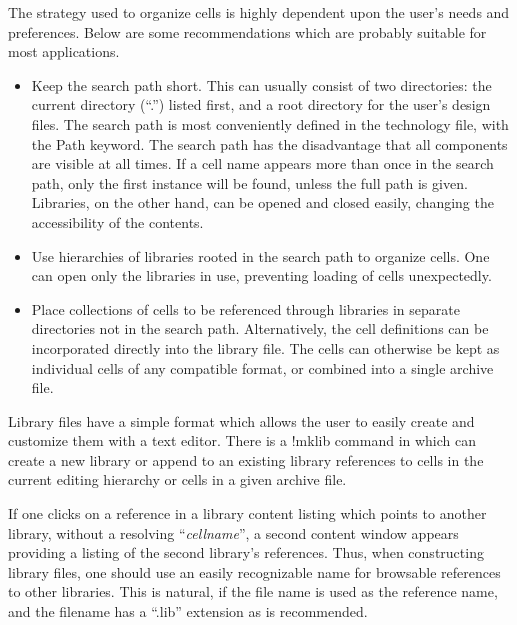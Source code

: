 The strategy used to organize cells is highly dependent upon the
user's needs and preferences.  Below are some recommendations which
are probably suitable for most applications.

\begin{itemize}
\item{Keep the search path short.  This can usually consist of two
    directories:  the current directory (``.'') listed first, and a
    root directory for the user's design files.  The search path is
    most conveniently defined in the technology file, with the {\et
    Path} keyword.  The search path has the disadvantage that all
    components are visible at all times.  If a cell name appears more
    than once in the search path, only the first instance will be
    found, unless the full path is given.  Libraries, on the other
    hand, can be opened and closed easily, changing the accessibility
    of the contents.
}
\item{Use hierarchies of libraries rooted in the search path to
    organize cells.  One can open only the libraries in use,
    preventing loading of cells unexpectedly.
}
\item{Place collections of cells to be referenced through libraries
    in separate directories not in the search path.  Alternatively,
    the {\Xic} cell definitions can be incorporated directly into the
    library file.  The cells can otherwise be kept as individual cells
    of any compatible format, or combined into a single archive file.
}
\end{itemize}

Library files have a simple format which allows the user to easily
create and customize them with a text editor.  There is a {\et !mklib}
command in {\Xic} which can create a new library or append to an
existing library references to cells in the current editing hierarchy
or cells in a given archive file.

If one clicks on a reference in a library content listing which points
to another library, without a resolving ``{\it cellname\/}'', a second
content window appears providing a listing of the second library's
references.  Thus, when constructing library files, one should use an
easily recognizable name for browsable references to other libraries. 
This is natural, if the file name is used as the reference name, and
the filename has a ``{\vt .lib}'' extension as is recommended.



